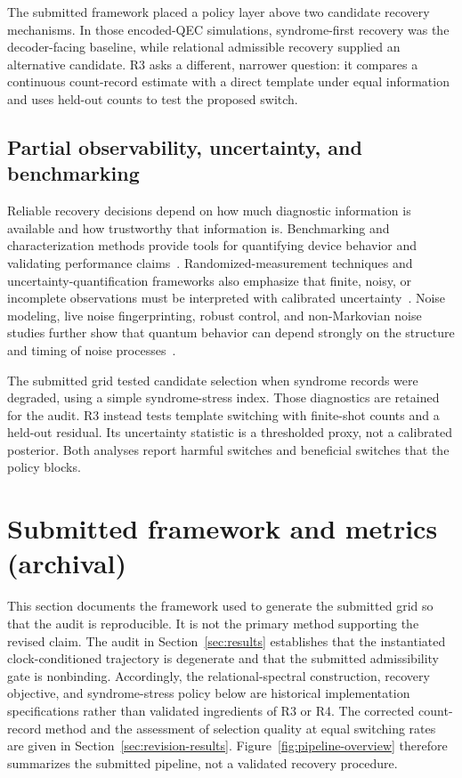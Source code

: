 \documentclass{iopjournal}
\begin{document}
The submitted framework placed a policy layer above two candidate recovery
mechanisms.  In those encoded-QEC simulations, syndrome-first recovery was the
decoder-facing baseline, while relational admissible recovery supplied an
alternative candidate.  R3 asks a different, narrower question: it compares a
continuous count-record estimate with a direct template under equal information
and uses held-out counts to test the proposed switch.

\subsection{Partial observability, uncertainty, and benchmarking}

Reliable recovery decisions depend on how much diagnostic information is available and 
how trustworthy that information is. Benchmarking and characterization methods provide 
tools for quantifying device behavior and validating performance claims~\cite{Hashim2025BenchmarkingCharacterization}. 
Randomized-measurement techniques and uncertainty-quantification frameworks also emphasize 
that finite, noisy, or incomplete observations must be interpreted with calibrated uncertainty~\cite{Cieslinski2024RandomisedMeasurements,Bennink2026UncertaintyQuantificationQC}. 
Noise modeling, live noise fingerprinting, robust control, and non-Markovian noise studies 
further show that quantum behavior can depend strongly on the structure and timing of noise 
processes~\cite{Ji2026DataEfficientNoiseModeling,Bensoussan2025LiveNoiseFingerprinting,Ding2025UniversallyRobustControl,Cai2020RandomTelegraphDephasing,Zhang2024NonMarkovianTeleportation,Zhuang2026FluxoniumNonMarkovian}.

The submitted grid tested candidate selection when syndrome records were
degraded, using a simple syndrome-stress index.  Those diagnostics are retained
for the audit.  R3 instead tests template switching with finite-shot counts and
a held-out residual.  Its uncertainty statistic is a thresholded proxy, not a
calibrated posterior.  Both analyses report harmful switches and beneficial
switches that the policy blocks.

\section{Submitted framework and metrics (archival)}\label{sec:methods}

This section documents the framework used to generate the submitted grid so that
the audit is reproducible. It is not the primary method supporting the revised
claim. The audit in Section~\ref{sec:results} establishes that the instantiated
clock-conditioned trajectory is degenerate and that the submitted admissibility
gate is nonbinding. Accordingly, the relational-spectral construction, recovery
objective, and syndrome-stress policy below are historical implementation
specifications rather than validated ingredients of R3 or R4. The corrected
count-record method and the assessment of selection quality at equal switching
rates are given in
Section~\ref{sec:revision-results}. Figure~\ref{fig:pipeline-overview} therefore
summarizes the submitted pipeline, not a validated recovery procedure.
\end{document}
